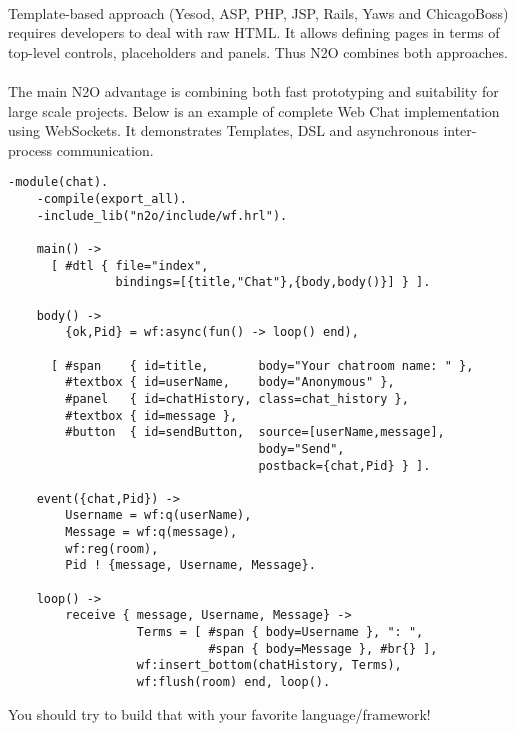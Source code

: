 \paragraph{}
Template-based approach (Yesod, ASP, PHP, JSP, Rails, Yaws and ChicagoBoss)
requires developers to deal with raw HTML. It allows
defining pages in terms of top-level controls, placeholders
and panels. Thus N2O combines both approaches.

\paragraph{}
The main N2O advantage is combining both fast prototyping and suitability for large
scale projects. Below is an example of complete Web Chat implementation using
WebSockets. It demonstrates Templates, DSL and asynchronous
inter-process communication.

\newpage
\vspace{1\baselineskip}
\begin{lstlisting}[caption=chat.erl]
    -module(chat).
    -compile(export_all).
    -include_lib("n2o/include/wf.hrl").

    main() ->
      [ #dtl { file="index",
               bindings=[{title,"Chat"},{body,body()}] } ].

    body() ->
        {ok,Pid} = wf:async(fun() -> loop() end),

      [ #span    { id=title,       body="Your chatroom name: " },
        #textbox { id=userName,    body="Anonymous" },
        #panel   { id=chatHistory, class=chat_history },
        #textbox { id=message },
        #button  { id=sendButton,  source=[userName,message],
                                   body="Send",
                                   postback={chat,Pid} } ].

    event({chat,Pid}) ->
        Username = wf:q(userName),
        Message = wf:q(message),
        wf:reg(room),
        Pid ! {message, Username, Message}.

    loop() ->
        receive { message, Username, Message} ->
                  Terms = [ #span { body=Username }, ": ",
                            #span { body=Message }, #br{} ],
                  wf:insert_bottom(chatHistory, Terms),
                  wf:flush(room) end, loop().
\end{lstlisting}
\vspace{1\baselineskip}

You should try to build that with your favorite language/framework!


